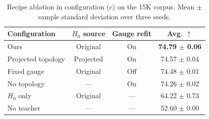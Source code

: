\begin{table}[t]
    \centering
    \caption{Recipe ablation in configuration (c) on the 15K corpus.
    Mean $\pm$ sample standard deviation over three seeds.}
    \label{tab:recipe-ablation}
    \small
    \begin{tabular}{@{}lccc@{}}
        \toprule
        Configuration & $H_0$ source & Gauge refit & Avg. $\uparrow$ \\
        \midrule
        Ours & Original & On & \textbf{74.79 $\pm$ 0.06} \\
        Projected topology & Projected & On & 74.57 $\pm$ 0.04 \\
        Fixed gauge & Original & Off & 74.48 $\pm$ 0.01 \\
        No topology & --- & On & 74.26 $\pm$ 0.02 \\
        $H_0$ only & Original & --- & 64.22 $\pm$ 0.73 \\
        No teacher & --- & --- & 52.60 $\pm$ 0.00 \\
        \bottomrule
    \end{tabular}
\end{table}
